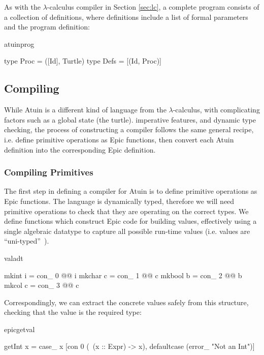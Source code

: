 \noindent
As with the $\lambda$-calculus compiler in Section \ref{sec:lc}, a
complete program consists of a collection of definitions,
where definitions include a list of formal parameters and the
program definition:

\begin{SaveVerbatim}{atuinprog}

type Proc = ([Id], Turtle)
type Defs = [(Id,  Proc)]

\end{SaveVerbatim}

\subsection{Compiling}

While Atuin is a different kind of language from the
$\lambda$-calculus, with complicating factors such as a global state
(the turtle). imperative features, and dynamic type checking, the
process of constructing a compiler follows the same general recipe, i.e.
define primitive operations as Epic functions, then convert each Atuin
definition into the corresponding Epic definition.

\subsubsection{Compiling Primitives}

The first step in defining a compiler for Atuin is to define primitive
operations as Epic functions. 
The language is dynamically
typed, therefore we will need primitive operations to check that they
are operating on the correct types. We define functions which
construct Epic code for
building values, effectively using a single algebraic datatype to
capture all possible run-time values (i.e. values are
``uni-typed''~\cite{wadlerblame}).

\begin{SaveVerbatim}{valadt}

mkint  i = con_ 0 @@ i
mkchar c = con_ 1 @@ c
mkbool b = con_ 2 @@ b
mkcol  c = con_ 3 @@ c

\end{SaveVerbatim}

\noindent
Correspondingly, we can extract the concrete values safely from this
structure, checking that the value is the required type:

\begin{SaveVerbatim}{epicgetval}

getInt x  = case_ x 
            [con 0 (\ (x :: Expr) -> x), 
             defaultcase (error_ "Not an Int")]

\end{SaveVerbatim}

